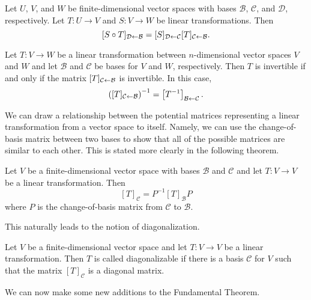 \documentclass[../m73main.tex]{chapters}
\begin{document}
\begin{theorem}
	Let $U$, $V$, and $W$ be finite-dimensional vector spaces with bases $\mathcal{B}$, $\mathcal{C}$, and $\mathcal{D}$, respectively.
	Let $T : U \to V$ and $S : V \to W$ be linear transformations.
	Then
	\[ [S \circ T]_{\mathcal{D} \leftarrow \mathcal{B}} = [S]_{\mathcal{D} \leftarrow \mathcal{C}} [T]_{\mathcal{C} \leftarrow \mathcal{B}}. \]
\end{theorem}

\begin{theorem}
	Let $T : V \to W$ be a linear transformation between $n$-dimensional vector spaces $V$ and $W$ and let $\mathcal{B}$ and $\mathcal{C}$ be bases for $V$ and $W$, respectively.
	Then $T$ is invertible if and only if the matrix $[T]_{\mathcal{C} \leftarrow \mathcal{B}}$ is invertible.
	In this case,
	\[ \left( [T]_{\mathcal{C} \leftarrow \mathcal{B}} \right)^{-1} = \left[ T^{-1} \right]_{\mathcal{B} \leftarrow \mathcal{C}}. \]
\end{theorem}

We can draw a relationship between the potential matrices representing a linear transformation from a vector space to itself.
Namely, we can use the change-of-basis matrix between two bases to show that all of the possible matrices are similar to each other.
This is stated more clearly in the following theorem.

\begin{theorem}
	Let $V$ be a finite-dimensional vector space with bases $\mathcal{B}$ and $\mathcal{C}$ and let $T : V \to V$ be a linear transformation.
	Then
	\[ [T]_{\mathcal{C}} = P^{-1}[T]_{\mathcal{B}}P \]
	where $P$ is the change-of-basis matrix from $\mathcal{C}$ to $\mathcal{B}$.
\end{theorem}

This naturally leads to the notion of diagonalization.

\begin{definition}
	Let $V$ be a finite-dimensional vector space and let $T : V \to V$ be a linear transformation.
	Then $T$ is called diagonalizable if there is a basis $\mathcal{C}$ for $V$ such that the matrix $[T]_{\mathcal{C}}$ is a diagonal matrix.
\end{definition}

We can now make some new additions to the Fundamental Theorem.
\end{document}
